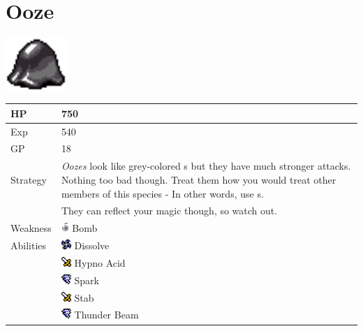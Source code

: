 \section{Ooze}
\label{monster:ooze}

\includegraphics[height=2cm,keepaspectratio]{./resources/monster/ooze}

\begin{longtable}{ l p{9cm} }
	HP
	& 750
\\ \hline
	Exp
	& 540
\\ \hline
	GP
	& 18
\\ \hline
	Strategy
	& \textit{Oozes} look like grey-colored \nameref{monster:slime}s but they have much stronger attacks. Nothing too bad though. Treat them how you would treat other members of this species - In other words, use \nameref{weapon:bomb}s. \\
	& They can reflect your magic though, so watch out.
\\ \hline
	Weakness
	& \includegraphics[height=1em,keepaspectratio]{./resources/effects/bomb} Bomb
\\ \hline
	Abilities
	& \includegraphics[height=1em,keepaspectratio]{./resources/effects/drain} Dissolve \\
	& \includegraphics[height=1em,keepaspectratio]{./resources/effects/damage} Hypno Acid \\
	& \includegraphics[height=1em,keepaspectratio]{./resources/effects/wind} Spark \\
	& \includegraphics[height=1em,keepaspectratio]{./resources/effects/damage} Stab \\
	& \includegraphics[height=1em,keepaspectratio]{./resources/effects/wind} Thunder Beam
\end{longtable}
